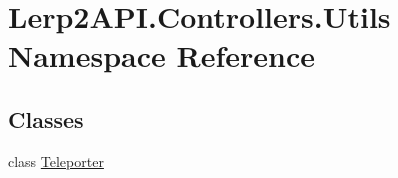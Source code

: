 \hypertarget{namespace_lerp2_a_p_i_1_1_controllers_1_1_utils}{}\section{Lerp2\+A\+P\+I.\+Controllers.\+Utils Namespace Reference}
\label{namespace_lerp2_a_p_i_1_1_controllers_1_1_utils}
\subsection*{Classes}
\begin{DoxyCompactItemize}
\item 
class \hyperlink{class_lerp2_a_p_i_1_1_controllers_1_1_utils_1_1_teleporter}{Teleporter}
\end{DoxyCompactItemize}
